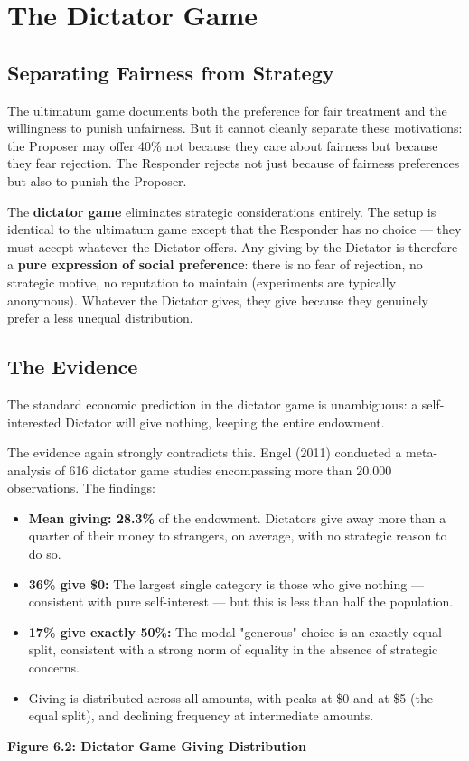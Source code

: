 \documentclass[12pt, letterpaper]{article}
\begin{document}
\medskip


\section{The Dictator Game}



\subsection{Separating Fairness from Strategy}


The ultimatum game documents both the preference for fair treatment and the willingness to punish unfairness. But it cannot cleanly separate these motivations: the Proposer may offer 40\% not because they care about fairness but because they fear rejection. The Responder rejects not just because of fairness preferences but also to punish the Proposer.

The \textbf{dictator game} eliminates strategic considerations entirely. The setup is identical to the ultimatum game except that the Responder has no choice --- they must accept whatever the Dictator offers. Any giving by the Dictator is therefore a \textbf{pure expression of social preference}: there is no fear of rejection, no strategic motive, no reputation to maintain (experiments are typically anonymous). Whatever the Dictator gives, they give because they genuinely prefer a less unequal distribution.


\subsection{The Evidence}


The standard economic prediction in the dictator game is unambiguous: a self-interested Dictator will give nothing, keeping the entire endowment.

The evidence again strongly contradicts this. Engel (2011) conducted a meta-analysis of 616 dictator game studies encompassing more than 20,000 observations. The findings:

\begin{itemize}
\item \textbf{Mean giving: 28.3\%} of the endowment. Dictators give away more than a quarter of their money to strangers, on average, with no strategic reason to do so.
\item \textbf{36\% give \$0:} The largest single category is those who give nothing --- consistent with pure self-interest --- but this is less than half the population.
\item \textbf{17\% give exactly 50\%:} The modal "generous" choice is an exactly equal split, consistent with a strong norm of equality in the absence of strategic concerns.
\item Giving is distributed across all amounts, with peaks at \$0 and at \$5 (the equal split), and declining frequency at intermediate amounts.
\end{itemize}
\newpage
\textbf{Figure 6.2: Dictator Game Giving Distribution}
\end{document}
